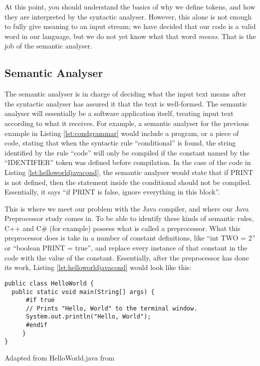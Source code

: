 At this point, you should understand the basics of why we define tokens, and how they are interpreted by the syntactic analyser. However, this alone is not enough to fully give meaning to an input stream; we have decided that our code is a valid word in our language, but we do not yet know what that word \emph{means}. That is the job of the semantic analyser.


\subsection{Semantic Analyser}

The semantic analyser is in charge of deciding what the input text means after the syntactic analyser has assured it that the text is well-formed. The semantic analyser will essentially be a software application itself, treating input text according to what it receives. For example, a semantic analyser for the previous example in Listing \ref{lst:condgrammar} would include a program, or a piece of code, stating that when the syntactic rule ``conditional'' is found, the string identified by the rule ``code'' will only be compiled if the constant named by the ``IDENTIFIER'' token was defined before compilation. In the case of the code in Listing \ref{lst:helloworldjavacond}, the semantic analyser would state that if PRINT is not defined, then the statement inside the conditional should not be compiled. Essentially, it says ``if PRINT is false, ignore everything in this block''.

This is where we meet our problem with the Java compiler, and where our Java Preprocessor study comes in. To be able to identify these kinds of semantic rules, C++ and C\# (for example) possess what is called a preprocessor. What this preprocessor does is take in a number of constant definitions, like ``int TWO = 2'' or ``boolean PRINT = true'', and replace every instance of that constant in the code with the value of the constant. Essentially, after the preprocessor has done its work, Listing \ref{lst:helloworldjavacond} would look like this:

\begin{listing}
\begin{verbatim}
public class HelloWorld {
  public static void main(String[] args) {
      #if true
      // Prints "Hello, World" to the terminal window.
      System.out.println("Hello, World");
      #endif
     }
}
\end{verbatim}
\caption{Adapted from HelloWorld.java from \cite{SEDGEWICK:2011}} \label{lst:helloworldjavaconditional2}
\end{listing}


